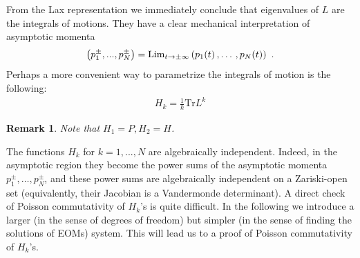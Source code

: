 \documentclass[12pt]{article}
\newtheorem{rem}{Remark}[section]
\numberwithin{equation}{section}
\newcommand\beq{\begin{equation}}
\newcommand\eeq{\end{equation}}
\theoremstyle{definition}
\begin{document}
 From the Lax representation we immediately conclude that eigenvalues of $L$ are the integrals of motions. They have a clear mechanical interpretation of asymptotic momenta 
 \beq
 \left( p_1^{\pm}, ..., p_{N}^{\pm} \right) = {\rm Lim}_{t \rightarrow \pm \infty} \left( p_{1}(t) \,, \ldots \, , p_{N}(t) \right)\ .
\eeq
 Perhaps a more convenient way to parametrize the integrals of motion is the following:
 \begin{align*}
     H_{k} = \frac{1}{k} \mathrm{Tr} L^{k}
 \end{align*}
 \begin{rem}\normalfont
     Note that $H_1 = P, H_2 = H$.
 \end{rem}
 The functions $H_{k}$ for $k=1, ..., N$ are algebraically independent. Indeed, in the asymptotic region they become the power sums of the asymptotic momenta $p_1^{\pm}, \ldots, p_N^{\pm}$, and these power sums are algebraically independent on a Zariski-open set (equivalently, their Jacobian is a Vandermonde determinant). A direct check of Poisson commutativity of $H_k$'s is quite difficult. In the following we introduce a larger (in the sense of degrees of freedom) but simpler (in the sense of finding the solutions of EOMs) system. This will lead us to a proof of Poisson commutativity of $H_{k}$'s.
\end{document}
